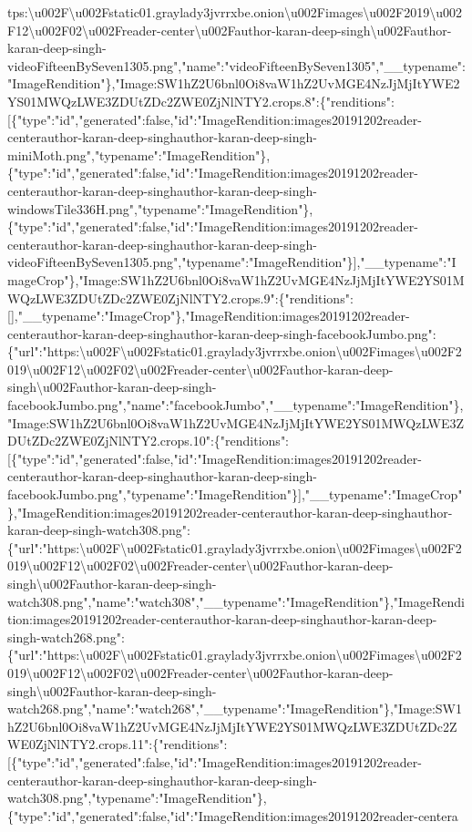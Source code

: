tps:\textbackslash{}u002F\textbackslash{}u002Fstatic01.graylady3jvrrxbe.onion\textbackslash{}u002Fimages\textbackslash{}u002F2019\textbackslash{}u002F12\textbackslash{}u002F02\textbackslash{}u002Freader-center\textbackslash{}u002Fauthor-karan-deep-singh\textbackslash{}u002Fauthor-karan-deep-singh-videoFifteenBySeven1305.png","name":"videoFifteenBySeven1305","\_\_typename":"ImageRendition"\},"Image:SW1hZ2U6bnl0Oi8vaW1hZ2UvMGE4NzJjMjItYWE2YS01MWQzLWE3ZDUtZDc2ZWE0ZjNlNTY2.crops.8":\{"renditions":{[}\{"type":"id","generated":false,"id":"ImageRendition:images20191202reader-centerauthor-karan-deep-singhauthor-karan-deep-singh-miniMoth.png","typename":"ImageRendition"\},\{"type":"id","generated":false,"id":"ImageRendition:images20191202reader-centerauthor-karan-deep-singhauthor-karan-deep-singh-windowsTile336H.png","typename":"ImageRendition"\},\{"type":"id","generated":false,"id":"ImageRendition:images20191202reader-centerauthor-karan-deep-singhauthor-karan-deep-singh-videoFifteenBySeven1305.png","typename":"ImageRendition"\}{]},"\_\_typename":"ImageCrop"\},"Image:SW1hZ2U6bnl0Oi8vaW1hZ2UvMGE4NzJjMjItYWE2YS01MWQzLWE3ZDUtZDc2ZWE0ZjNlNTY2.crops.9":\{"renditions":{[}{]},"\_\_typename":"ImageCrop"\},"ImageRendition:images20191202reader-centerauthor-karan-deep-singhauthor-karan-deep-singh-facebookJumbo.png":\{"url":"https:\textbackslash{}u002F\textbackslash{}u002Fstatic01.graylady3jvrrxbe.onion\textbackslash{}u002Fimages\textbackslash{}u002F2019\textbackslash{}u002F12\textbackslash{}u002F02\textbackslash{}u002Freader-center\textbackslash{}u002Fauthor-karan-deep-singh\textbackslash{}u002Fauthor-karan-deep-singh-facebookJumbo.png","name":"facebookJumbo","\_\_typename":"ImageRendition"\},"Image:SW1hZ2U6bnl0Oi8vaW1hZ2UvMGE4NzJjMjItYWE2YS01MWQzLWE3ZDUtZDc2ZWE0ZjNlNTY2.crops.10":\{"renditions":{[}\{"type":"id","generated":false,"id":"ImageRendition:images20191202reader-centerauthor-karan-deep-singhauthor-karan-deep-singh-facebookJumbo.png","typename":"ImageRendition"\}{]},"\_\_typename":"ImageCrop"\},"ImageRendition:images20191202reader-centerauthor-karan-deep-singhauthor-karan-deep-singh-watch308.png":\{"url":"https:\textbackslash{}u002F\textbackslash{}u002Fstatic01.graylady3jvrrxbe.onion\textbackslash{}u002Fimages\textbackslash{}u002F2019\textbackslash{}u002F12\textbackslash{}u002F02\textbackslash{}u002Freader-center\textbackslash{}u002Fauthor-karan-deep-singh\textbackslash{}u002Fauthor-karan-deep-singh-watch308.png","name":"watch308","\_\_typename":"ImageRendition"\},"ImageRendition:images20191202reader-centerauthor-karan-deep-singhauthor-karan-deep-singh-watch268.png":\{"url":"https:\textbackslash{}u002F\textbackslash{}u002Fstatic01.graylady3jvrrxbe.onion\textbackslash{}u002Fimages\textbackslash{}u002F2019\textbackslash{}u002F12\textbackslash{}u002F02\textbackslash{}u002Freader-center\textbackslash{}u002Fauthor-karan-deep-singh\textbackslash{}u002Fauthor-karan-deep-singh-watch268.png","name":"watch268","\_\_typename":"ImageRendition"\},"Image:SW1hZ2U6bnl0Oi8vaW1hZ2UvMGE4NzJjMjItYWE2YS01MWQzLWE3ZDUtZDc2ZWE0ZjNlNTY2.crops.11":\{"renditions":{[}\{"type":"id","generated":false,"id":"ImageRendition:images20191202reader-centerauthor-karan-deep-singhauthor-karan-deep-singh-watch308.png","typename":"ImageRendition"\},\{"type":"id","generated":false,"id":"ImageRendition:images20191202reader-centera